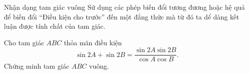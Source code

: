 \begin{dang}{Nhận dạng tam giác vuông}
	Sử dụng các phép biến đổi tương đương hoặc hệ quả để biến đổi ``Điều kiện cho
	trước'' đến một đẳng thức mà từ đó ta dể dàng kết luận được tính chất của tam giác.
\end{dang}
\begin{vd}%
	Cho tam giác $ ABC $ thỏa mãn điều kiện 
	$$\sin 2A + \sin 2B = \dfrac{\sin 2A \sin 2B}{\cos A \cos B}. $$
	Chứng minh tam giác $ ABC $  vuông.
\end{vd}

